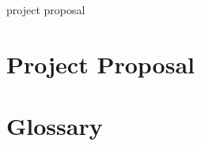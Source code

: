 \documentclass[12pt,twoside,notitlepage]{report}
\begin{document}
project proposal

\cleardoublepage
\chapter{Project Proposal}













\cleardoublepage
\chapter{Glossary}
\glsaddall
\printglossaries
\end{document}
